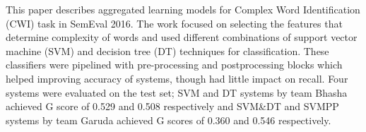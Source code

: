 This paper describes aggregated learning models for Complex Word Identification (CWI) task in SemEval 2016. The work focused on selecting the features that determine complexity of words and used different combinations of support vector machine (SVM) and decision tree (DT) techniques for classification. These classifiers were pipelined with pre-processing and postprocessing blocks which helped improving accuracy of systems, though had little impact on recall. Four systems were evaluated on the test set; SVM and DT systems by team Bhasha achieved G score of 0.529 and 0.508 respectively and SVM\&DT and SVMPP systems by team Garuda achieved G scores of 0.360 and 0.546 respectively.
